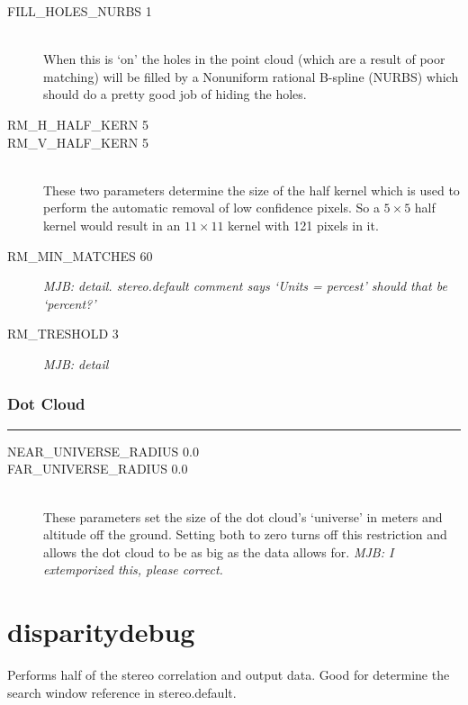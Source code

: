 \begin{description}

\item[FILL\_HOLES\_NURBS 1] \hfill \\
When this is `on' the holes in the point cloud (which are a result of poor matching) will be filled by a Nonuniform rational B-spline (NURBS) which should do a pretty good job of hiding the holes.

\item[RM\_H\_HALF\_KERN 5]
\item[RM\_V\_HALF\_KERN 5] \hfill \\
These two parameters determine the size of the half kernel which
is used to perform the automatic removal of low confidence pixels.
So a $5 \times 5$ half kernel would result in an $11 \times 11$
kernel with 121 pixels in it.

\item[RM\_MIN\_MATCHES 60]
\emph{MJB: detail.  stereo.default comment says `Units = percest'  should that be `percent?'}

\item[RM\_TRESHOLD 3]
\emph{MJB: detail}

\end{description}


\subsubsection*{Dot Cloud}
\hrule
\bigskip

\begin{description}
\item[NEAR\_UNIVERSE\_RADIUS 0.0]
\item[FAR\_UNIVERSE\_RADIUS 0.0] \hfill \\
These parameters set the size of the dot cloud's `universe' in meters and altitude off the ground.  Setting both to zero turns off this restriction and allows the dot cloud to be as big as the data allows for. \emph{MJB: I extemporized this, please correct.}

\end{description}

\section{disparitydebug}
\label{disparitydebug}

Performs half of the stereo correlation and output data. Good for
determine the search window reference in stereo.default.

